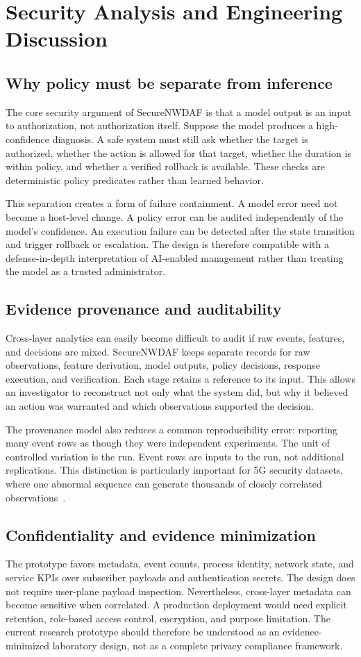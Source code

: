 \documentclass[sigconf,review]{acmart}
\begin{document}
\section{Security Analysis and Engineering Discussion}
\subsection{Why policy must be separate from inference}
The core security argument of SecureNWDAF is that a model output is an input to authorization, not authorization itself. Suppose the model produces a high-confidence diagnosis. A safe system must still ask whether the target is authorized, whether the action is allowed for that target, whether the duration is within policy, and whether a verified rollback is available. These checks are deterministic policy predicates rather than learned behavior.

This separation creates a form of failure containment. A model error need not become a host-level change. A policy error can be audited independently of the model's confidence. An execution failure can be detected after the state transition and trigger rollback or escalation. The design is therefore compatible with a defense-in-depth interpretation of AI-enabled management rather than treating the model as a trusted administrator.

\subsection{Evidence provenance and auditability}
Cross-layer analytics can easily become difficult to audit if raw events, features, and decisions are mixed. SecureNWDAF keeps separate records for raw observations, feature derivation, model outputs, policy decisions, response execution, and verification. Each stage retains a reference to its input. This allows an investigator to reconstruct not only what the system did, but why it believed an action was warranted and which observations supported the decision.

The provenance model also reduces a common reproducibility error: reporting many event rows as though they were independent experiments. The unit of controlled variation is the run. Event rows are inputs to the run, not additional replications. This distinction is particularly important for 5G security datasets, where one abnormal sequence can generate thousands of closely correlated observations~\cite{5gprovgen}.

\subsection{Confidentiality and evidence minimization}
The prototype favors metadata, event counts, process identity, network state, and service KPIs over subscriber payloads and authentication secrets. The design does not require user-plane payload inspection. Nevertheless, cross-layer metadata can become sensitive when correlated. A production deployment would need explicit retention, role-based access control, encryption, and purpose limitation. The current research prototype should therefore be understood as an evidence-minimized laboratory design, not as a complete privacy compliance framework.
\end{document}
